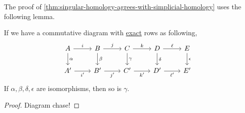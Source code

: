 \par The proof of \autoref{thm:singular-homology-agrees-with-simplicial-homology} uses the following lemma.
\begin{lemma}\label{lma:the-five-lemma}
	If we have a commutative diagram with \hyperref[def:exact]{exact} rows as following,
	\[
		\begin{tikzcd}
			A & B & C & D & E \\
			{A^\prime} & {B^\prime} & {C^\prime} & {D^\prime} & {E^\prime}
			\arrow["\alpha", from=1-1, to=2-1]
			\arrow["\gamma", from=1-3, to=2-3]
			\arrow["\delta", from=1-4, to=2-4]
			\arrow["\epsilon", from=1-5, to=2-5]
			\arrow["{i^\prime}"', from=2-1, to=2-2]
			\arrow["\beta", from=1-2, to=2-2]
			\arrow["{j^\prime}"', from=2-2, to=2-3]
			\arrow["{k^\prime}"', from=2-3, to=2-4]
			\arrow["{\ell^\prime}"', from=2-4, to=2-5]
			\arrow["\ell", from=1-4, to=1-5]
			\arrow["k", from=1-3, to=1-4]
			\arrow["j", from=1-2, to=1-3]
			\arrow["i", from=1-1, to=1-2]
		\end{tikzcd}
	\]
	If \(\alpha, \beta, \delta, \epsilon\) are isomorphisms, then so is \(\gamma\).
\end{lemma}
\begin{proof}
	Diagram chase!
\end{proof}